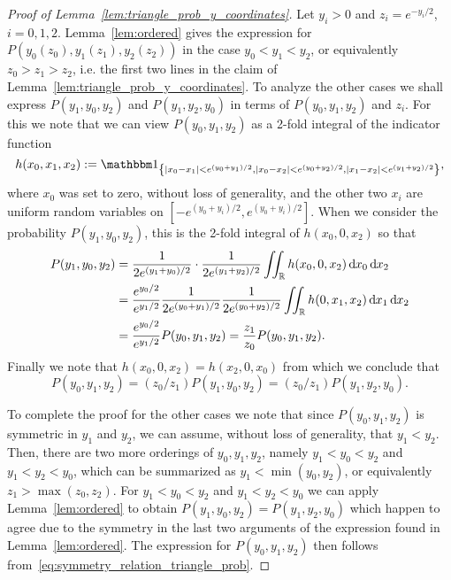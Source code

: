 \begin{proof}[Proof of Lemma~\ref{lem:triangle_prob_y_coordinates}]
Let $y_i >0$ and $z_i = e^{-y_i/2}$, $i=0,1,2$. Lemma~\ref{lem:ordered} gives the expression for $P(y_0(z_0),y_1(z_1),y_2(z_2))$ in the case $y_0<y_1<y_2$, or equivalently $z_0>z_1>z_2$, i.e. the first two lines in the claim of Lemma~\ref{lem:triangle_prob_y_coordinates}. To analyze the other cases we shall express $P(y_1,y_0,y_2)$ and $P(y_1,y_2,y_0)$ in terms of $P(y_0,y_1,y_2)$ and $z_i$. For this we note that we can view $P(y_0,y_1,y_2)$ as a 2-fold integral of the indicator function
\[ 
	h(x_0, x_1, x_2) := \ind{ |x_0 - x_1| < e^{(y_0+y_1)/2}, |x_0 - x_2| < e^{(y_0+y_2)/2}, |x_1-x_2| < e^{(y_1+y_2)/2}}, 
\]
where $x_0$ was set to zero, without loss of generality, and the other two $x_i$ are uniform random variables on $[-e^{(y_0+y_i)/2}, e^{(y_0+y_i)/2}]$. When we consider the probability $P(y_1,y_0,y_2)$, this is the 2-fold integral of $h(x_0,0,x_2)$ so that
\begin{align*}
	P(y_1,y_0,y_2) &= \frac{1}{2e^{(y_1+y_0)/2}} \cdot \frac{1}{2e^{(y_1+y_2)/2}} 
		\iint_{{\mathbb R}} h(x_0,0,x_2) \operatorname{\mathrm{d}\hspace{-2pt}} x_0 \operatorname{\mathrm{d}\hspace{-2pt}} x_2\\
	&= \frac{e^{y_0/2}}{e^{y_1/2}} \frac{1}{2e^{(y_0+y_1)/2}} \frac{1}{2e^{(y_0+y_2)/2}} 
		\iint_{{\mathbb R}} h(0,x_1,x_2) \operatorname{\mathrm{d}\hspace{-2pt}} x_1 \operatorname{\mathrm{d}\hspace{-2pt}} x_2\\
	&= \frac{e^{y_0/2}}{e^{y_1/2}} P(y_0,y_1,y_2) = \frac{z_1}{z_0}  P(y_0,y_1,y_2).
\end{align*}
Finally we note that $h(x_0,0,x_2) = h(x_2,0,x_0)$ from which we conclude that
\begin{equation}\label{eq:symmetry_relation_triangle_prob}
	P(y_0, y_1, y_2) = \left(z_0/z_1\right) P(y_1,y_0,y_2) = \left(z_0/z_1\right) P(y_1,y_2,y_0).
\end{equation}

To complete the proof for the other cases we note that since $P(y_0,y_1,y_2)$ is symmetric in $y_1$ and $y_2$, we can assume, without loss of generality, that $y_1 < y_2$. Then, there are two more orderings of $y_0, y_1, y_2$, namely $y_1< y_0< y_2$ and $y_1<y_2<y_0$, which can be summarized as $y_1 < \min (y_0,y_2)$, or equivalently $z_1 > \max(z_0,z_2)$. For $y_1 < y_0 < y_2$ and $y_1 < y_2<y_0$ we can apply Lemma~\ref{lem:ordered} to obtain $P(y_1,y_0,y_2) = P(y_1,y_2,y_0)$ which happen to agree due to the symmetry in the last two arguments of the expression found in Lemma~\ref{lem:ordered}. The expression for $P(y_0,y_1,y_2)$ then follows from~\eqref{eq:symmetry_relation_triangle_prob}.
\end{proof}

